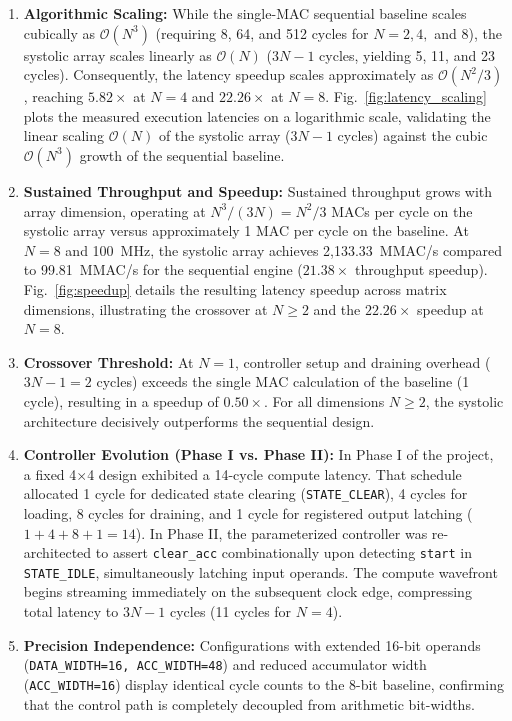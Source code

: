 \documentclass[conference]{IEEEtran}
\begin{document}
\begin{enumerate}
    \item \textbf{Algorithmic Scaling:} While the single-MAC sequential baseline scales cubically as $\mathcal{O}(N^3)$ (requiring 8, 64, and 512 cycles for $N=2, 4,$ and $8$), the systolic array scales linearly as $\mathcal{O}(N)$ ($3N-1$ cycles, yielding 5, 11, and 23 cycles). Consequently, the latency speedup scales approximately as $\mathcal{O}(N^2 / 3)$, reaching $5.82\times$ at $N=4$ and $22.26\times$ at $N=8$. Fig.~\ref{fig:latency_scaling} plots the measured execution latencies on a logarithmic scale, validating the linear scaling $\mathcal{O}(N)$ of the systolic array ($3N-1$ cycles) against the cubic $\mathcal{O}(N^3)$ growth of the sequential baseline.
    \item \textbf{Sustained Throughput and Speedup:} Sustained throughput grows with array dimension, operating at $N^3 / (3N) = N^2 / 3$ MACs per cycle on the systolic array versus approximately 1 MAC per cycle on the baseline. At $N=8$ and 100~MHz, the systolic array achieves 2,133.33~MMAC/s compared to 99.81~MMAC/s for the sequential engine ($21.38\times$ throughput speedup). Fig.~\ref{fig:speedup} details the resulting latency speedup across matrix dimensions, illustrating the crossover at $N \ge 2$ and the $22.26\times$ speedup at $N=8$.
    \item \textbf{Crossover Threshold:} At $N=1$, controller setup and draining overhead ($3N-1 = 2$ cycles) exceeds the single MAC calculation of the baseline (1 cycle), resulting in a speedup of $0.50\times$. For all dimensions $N \ge 2$, the systolic architecture decisively outperforms the sequential design.
    \item \textbf{Controller Evolution (Phase I vs. Phase II):} In Phase I of the project, a fixed 4$\times$4 design exhibited a 14-cycle compute latency. That schedule allocated 1 cycle for dedicated state clearing (\texttt{STATE\_CLEAR}), 4 cycles for loading, 8 cycles for draining, and 1 cycle for registered output latching ($1 + 4 + 8 + 1 = 14$). In Phase II, the parameterized controller was re-architected to assert \texttt{clear\_acc} combinationally upon detecting \texttt{start} in \texttt{STATE\_IDLE}, simultaneously latching input operands. The compute wavefront begins streaming immediately on the subsequent clock edge, compressing total latency to $3N-1$ cycles (11 cycles for $N=4$).
    \item \textbf{Precision Independence:} Configurations with extended 16-bit operands (\texttt{DATA\_WIDTH=16, ACC\_WIDTH=48}) and reduced accumulator width (\texttt{ACC\_WIDTH=16}) display identical cycle counts to the 8-bit baseline, confirming that the control path is completely decoupled from arithmetic bit-widths.
\end{enumerate}
\end{document}
